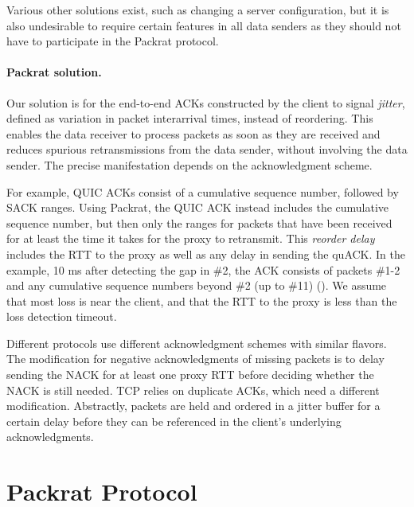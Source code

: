 Various other solutions exist, such as changing a server configuration, but it
is also undesirable to require certain features in all data senders as they
should not have to participate in the Packrat protocol.

\paragraph{Packrat solution.}

Our solution is for the end-to-end ACKs constructed by the client to
signal \textit{jitter}, defined as variation in packet interarrival times,
instead of reordering. This enables the data receiver to process packets as
soon as they are received and reduces spurious retransmissions from the data
sender, without involving the data sender. The precise manifestation depends on
the acknowledgment scheme.

For example, QUIC ACKs consist of a cumulative sequence number, followed by SACK
ranges. Using Packrat, the QUIC ACK instead includes the cumulative sequence
number, but then only the ranges for packets that have been received for at
least the time it takes for the proxy to retransmit. This
\textit{reorder delay} includes the RTT to the proxy
as well as any delay in sending the quACK.
In the example, 10 ms after detecting the gap in \#2, the ACK consists
of packets \#1-2 and any cumulative sequence numbers beyond \#2 (up to \#11)
().
We assume
that most loss is near the client, and that the RTT to the proxy is less than
the loss detection timeout.

Different protocols use different acknowledgment schemes with similar flavors.
The modification for negative acknowledgments of missing packets is to delay
sending the NACK for at least one proxy RTT before deciding whether the NACK is
still needed. TCP relies on duplicate ACKs, which need a different
modification. Abstractly, packets are held and ordered in a jitter buffer for a
certain delay before they can be referenced in the client's underlying
acknowledgments.

\section{Packrat Protocol}

